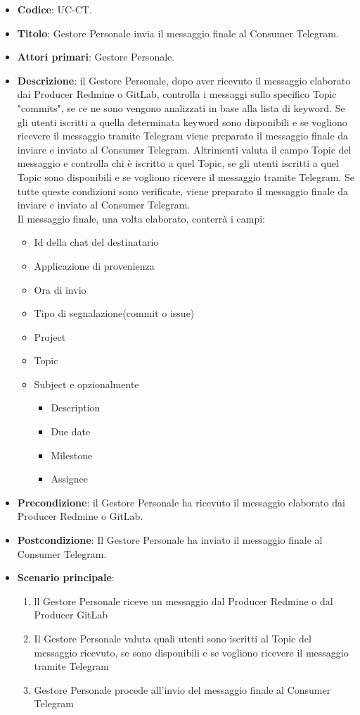 	\begin{itemize}
		\item \textbf{Codice}: UC\theuccount-CT.
		\item \textbf{Titolo}: Gestore Personale invia il messaggio finale al Consumer Telegram.
		\item \textbf{Attori primari}: Gestore Personale.
		\item \textbf{Descrizione}: il Gestore Personale, dopo aver ricevuto il messaggio elaborato
		dai Producer Redmine o GitLab, controlla i messaggi sullo specifico Topic "commits", se ce ne
		sono vengono analizzati in base alla	lista di keyword. Se gli utenti iscritti a quella determinata
		keyword sono disponibili e se vogliono ricevere il messaggio tramite Telegram viene preparato
		il messaggio finale da inviare e inviato al Consumer Telegram. Altrimenti valuta il campo Topic del
		messaggio e controlla chi è iscritto a quel Topic, se gli utenti iscritti a quel Topic sono disponibili e
		se vogliono ricevere il messaggio tramite Telegram. Se tutte queste condizioni sono verificate, viene preparato
		il messaggio finale da inviare e inviato al Consumer Telegram.\\
		Il messaggio finale, una volta elaborato, conterrà i campi:
		\begin{itemize}
			\item Id della chat del destinatario
			\item Applicazione di provenienza
			\item Ora di invio
			\item Tipo di segnalazione(commit o issue)
			\item Project
			\item Topic
			\item Subject e opzionalmente
		 	\begin{itemize}
				\item Description
				\item Due date
				\item Milestone
				\item Assignee
			\end{itemize}
		\end{itemize}
		\item \textbf{Precondizione}: il Gestore Personale ha ricevuto il messaggio elaborato dai Producer Redmine o GitLab.
		\item \textbf{Postcondizione}: Il Gestore Personale ha inviato il messaggio finale al Consumer Telegram.
		\item \textbf{Scenario principale}: 
		\begin{enumerate}
			\item ll Gestore Personale riceve un messaggio dal Producer Redmine o dal Producer GitLab
			\item Il Gestore Personale valuta quali utenti sono iscritti al Topic del messaggio ricevuto, se sono disponibili e se vogliono ricevere il messaggio tramite Telegram
			\item Gestore Personale procede all'invio del messaggio finale al Consumer Telegram
		\end{enumerate}
		
	\end{itemize}